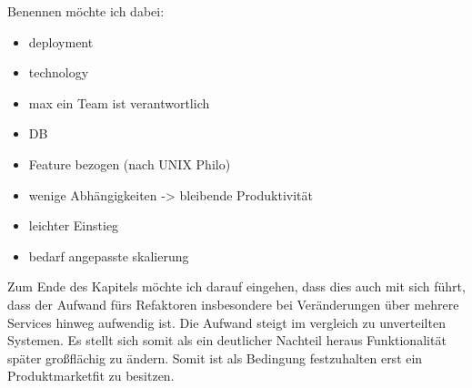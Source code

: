 Benennen möchte ich dabei:
\begin{itemize}
	\item deployment
	\item technology
	\item max ein Team ist verantwortlich
	\item DB
	\item Feature bezogen (nach UNIX Philo)
	\item wenige Abhängigkeiten -> bleibende Produktivität
	\item leichter Einstieg
	\item bedarf angepasste skalierung
\end{itemize}

Zum Ende des Kapitels möchte ich darauf eingehen, dass dies auch mit sich führt, dass der Aufwand fürs Refaktoren insbesondere bei Veränderungen über mehrere Services hinweg aufwendig ist. Die Aufwand steigt im vergleich zu unverteilten Systemen. Es stellt sich somit als ein deutlicher Nachteil heraus Funktionalität später großflächig zu ändern.
Somit ist als Bedingung festzuhalten erst ein Produktmarketfit zu besitzen.